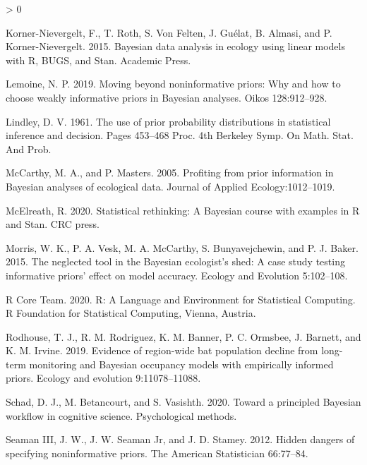\documentclass[
  12pt,
]{article}
\newlength{\cslhangindent}
\newenvironment{CSLReferences}[2] %
 {%
  \setlength{\parindent}{0pt}
  \ifodd #1 \everypar{\setlength{\hangindent}{\cslhangindent}}\ignorespaces\fi
  \ifnum #2 > 0
  \setlength{\parskip}{#2\baselineskip}
  \fi
 }%
 {}
\begin{document}
\begin{CSLReferences}{1}{0}
\leavevmode\hypertarget{ref-korner-nievergelt_bayesian_2015}{}%
Korner-Nievergelt, F., T. Roth, S. Von Felten, J. Guélat, B. Almasi, and
P. Korner-Nievergelt. 2015. Bayesian data analysis in ecology using
linear models with {R}, {BUGS}, and {Stan}. Academic Press.

\leavevmode\hypertarget{ref-lemoine_moving_2019}{}%
Lemoine, N. P. 2019. Moving beyond noninformative priors: Why and how to
choose weakly informative priors in {Bayesian} analyses. Oikos
128:912--928.

\leavevmode\hypertarget{ref-lindley_use_1961}{}%
Lindley, D. V. 1961. The use of prior probability distributions in
statistical inference and decision. Pages 453--468 Proc. 4th {Berkeley}
{Symp}. On {Math}. {Stat}. And {Prob}.

\leavevmode\hypertarget{ref-mccarthy_profiting_2005}{}%
McCarthy, M. A., and P. Masters. 2005. Profiting from prior information
in {Bayesian} analyses of ecological data. Journal of Applied
Ecology:1012--1019.

\leavevmode\hypertarget{ref-mcelreath_statistical_2020}{}%
McElreath, R. 2020. Statistical rethinking: {A} {Bayesian} course with
examples in {R} and {Stan}. CRC press.

\leavevmode\hypertarget{ref-morris_neglected_2015}{}%
Morris, W. K., P. A. Vesk, M. A. McCarthy, S. Bunyavejchewin, and P. J.
Baker. 2015. The neglected tool in the {Bayesian} ecologist's shed: A
case study testing informative priors' effect on model accuracy. Ecology
and Evolution 5:102--108.

\leavevmode\hypertarget{ref-r_core_team_r_2020}{}%
R Core Team. 2020. R: {A} {Language} and {Environment} for {Statistical}
{Computing}. R Foundation for Statistical Computing, Vienna, Austria.

\leavevmode\hypertarget{ref-rodhouse_evidence_2019}{}%
Rodhouse, T. J., R. M. Rodriguez, K. M. Banner, P. C. Ormsbee, J.
Barnett, and K. M. Irvine. 2019. Evidence of region-wide bat population
decline from long-term monitoring and {Bayesian} occupancy models with
empirically informed priors. Ecology and evolution 9:11078--11088.

\leavevmode\hypertarget{ref-schad_toward_2020}{}%
Schad, D. J., M. Betancourt, and S. Vasishth. 2020. Toward a principled
{Bayesian} workflow in cognitive science. Psychological methods.

\leavevmode\hypertarget{ref-seaman_iii_hidden_2012}{}%
Seaman III, J. W., J. W. Seaman Jr, and J. D. Stamey. 2012. Hidden
dangers of specifying noninformative priors. The American Statistician
66:77--84.


\end{CSLReferences}
\end{document}
